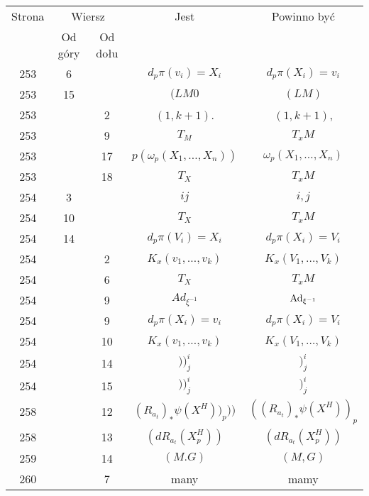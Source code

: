 \documentclass[a4paper,11pt]{article}
\begin{document}
\begin{center}
  \begin{tabular}{|c|c|c|c|c|}
    \hline
    Strona & \multicolumn{2}{c|}{Wiersz} & Jest
                              & Powinno być \\ \cline{2-3}
    & Od góry & Od dołu & & \\
    \hline
    253 & \hphantom{0}6 & & $d_{ p } \pi( v_{ i } ) = X_ { i }$
           & $d_{ p } \pi( X_{ i }) = v_ { i }$ \\
    253 & 15 & & $( LM 0$ & $( LM )$ \\
    253 & & \hphantom{0}2 & $( 1, k + 1 )$. & $( 1, k + 1 )$, \\
    253 & & \hphantom{0}9 & $T_{ M }$ & $T_{ x }M$ \\
    253 & & 17 & $p( \omega_{ p }( X_{ 1 }, \ldots, X_{ n } ) )$
           & $\omega_{ p }( X_{ 1 }, \ldots, X_{ n } )$ \\
    253 & & 18 & $T_{ X }$ & $T_{ x }M$ \\
    254 & \hphantom{0}3 & & $ij$ & $i, j$ \\
    254 & 10 & & $T_{ X }$ & $T_{ x }M$ \\
    254 & 14 & & $d_{ p } \pi( V_{ i } ) = X_{ i }$
    & $d_{ p } \pi( X_{ i } ) = V_{ i }$ \\
    254 & & \hphantom{0}2 & $K_{ x }( v_{ 1 }, \ldots, v_{ k } )$
    & $K_{ x }( V_{ 1 }, \ldots, V_{ k } )$ \\
    254 & & \hphantom{0}6 & $T_{ X }$ & $T_{ x }M$ \\
    254 & & \hphantom{0}9 & $Ad_{ \xi^{ -1 } }$ & $\mathrm{Ad}_{ \xi^{ -1 } }$ \\
    254 & & \hphantom{0}9 & $d_{ p } \pi( X_{ i } ) = v_{ i }$
           & $d_{ p } \pi( X_{ i } ) = V_{ i }$ \\
    254 & & 10 & $K_{ x }( v_{ 1 }, \ldots, v_{ k } )$
           & $K_{ x }( V_{ 1 }, \ldots, V_{ k } )$ \\
    254 & & 14 & $) )^{ i }_{ j }$ & $)^{ i }_{ j }$ \\
    254 & & 15 & $) )^{ i }_{ j }$ & $)^{ i }_{ j }$ \\
    258 & & 12 & $( R_{ a_{ t } } )_{ * } \psi( X^{ H } ) )_{ p } ) )$
           & $( ( R_{ a_{ t } } )_{ * } \psi( X^{ H } ) )_{ p }$ \\
    258 & & 13 & $( dR_{ a_{ t } }( X_{ p }^{ H } ) )$
           & $( dR_{ a_{ t } }( X_{ p }^{ H } ) )$ \\[0.5em]
    259 & & 14 & $( M. G )$ & $( M, G )$ \\
    260 & & \hphantom{0}7 & many & mamy \\

\end{tabular}
\end{center}
\end{document}
